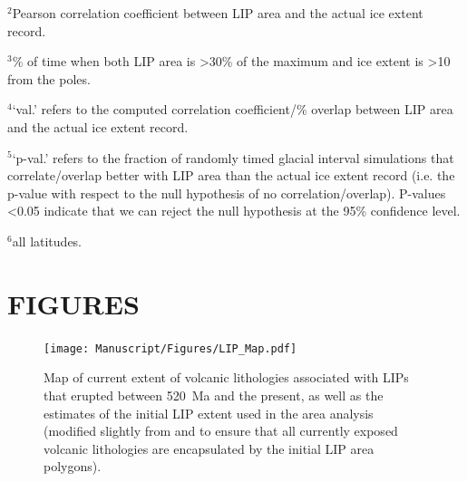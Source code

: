 \documentclass[11pt,letterpaper]{article}
\begin{document}
\begin{table}[h!]
\begin{tablenotes}
$^{2}$Pearson correlation coefficient between LIP area and the actual ice extent record.
\vspace{0.15cm}

$^{3}$\% of time when both LIP area is \textgreater30\% of the maximum and ice extent is \textgreater10\textdegree\xspace from the poles.
\vspace{0.15cm}

$^{4}$`val.' refers to the computed correlation coefficient/\% overlap between LIP area and the actual ice extent record.
\vspace{0.15cm}

$^{5}$`p-val.' refers to the fraction of randomly timed glacial interval simulations that correlate/overlap better with LIP area than the actual ice extent record (i.e. the p-value with respect to the null hypothesis of no correlation/overlap). P-values \textless0.05 indicate that we can reject the null hypothesis at the 95\% confidence level.
\vspace{0.15cm}

$^{6}$all latitudes.
\end{tablenotes}
\label{tab:stats}
\end{table}

\clearpage
\newpage

\section*{FIGURES}

\begin{figure}[h!]
\begin{center}
	\texttt{[image: Manuscript/Figures/LIP\_Map.pdf]}
	\caption{Map of current extent of volcanic lithologies associated with LIPs that erupted between 520~Ma and the present, as well as the estimates of the initial LIP extent used in the area analysis (modified slightly from \citealt{Ernst2017a} and \citealt{Ernst2019a} to ensure that all currently exposed volcanic lithologies are encapsulated by the initial LIP area polygons).}
	\label{fig:LIP_map}
\end{center}
\end{figure}
\end{document}

